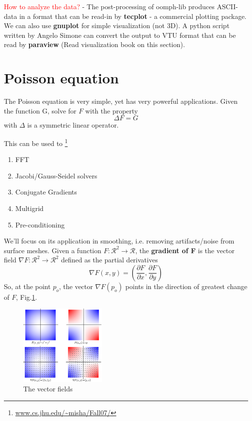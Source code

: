 \textcolor{red}{How to analyze the data?} - The post-processing of oomph-lib
produces ASCII-data in a format that can be read-in by {\bf tecplot} - a commercial plotting
package. We can also use {\bf gnuplot} for simple visualization (not 3D). A
python script written by Angelo Simone can convert the output to VTU format that
can be read by {\bf paraview} (Read visualization book on this section).

\section{Poisson equation}

The Poisson equation is very simple, yet has very powerful applications. Given
the function G, solve for $F$ with the property
\begin{equation}
\Delta F = G
\end{equation}
with $\Delta$ is a symmetric linear operator.

This can be used to \footnote{\url{www.cs.jhu.edu/~misha/Fall07/}} 
\begin{enumerate}
  \item FFT
  \item Jacobi/Gauss-Seidel solvers
  \item Conjugate Gradients
  \item Multigrid
  \item Pre-conditioning
\end{enumerate}

We'll focus on its application in smoothing, i.e. removing artifacts/noise from
surface meshes. Given a function $F:\mathcal{R}^2\rightarrow \mathcal{R}$, the
{\bf gradient of F} is the vector field $\nabla F: \mathcal{R}^2 \rightarrow\mathcal{R}^2$ 
defined as the partial derivatives
\begin{equation}
\nabla F(x,y) = \left( \frac{\partial F}{\partial x}, \frac{\partial
F}{\partial y}\right)
\end{equation}
So, at the point $p_o$, the vector $\nabla F(p_o)$ points in the direction of
greatest change of $F$, Fig.\ref{fig:gradient}.


\begin{figure}[hbt]
  \centerline{\includegraphics[height=4cm,
    angle=0]{./images/gradient.eps}}
  \caption{The vector fields}
\label{fig:gradient}
\end{figure}

